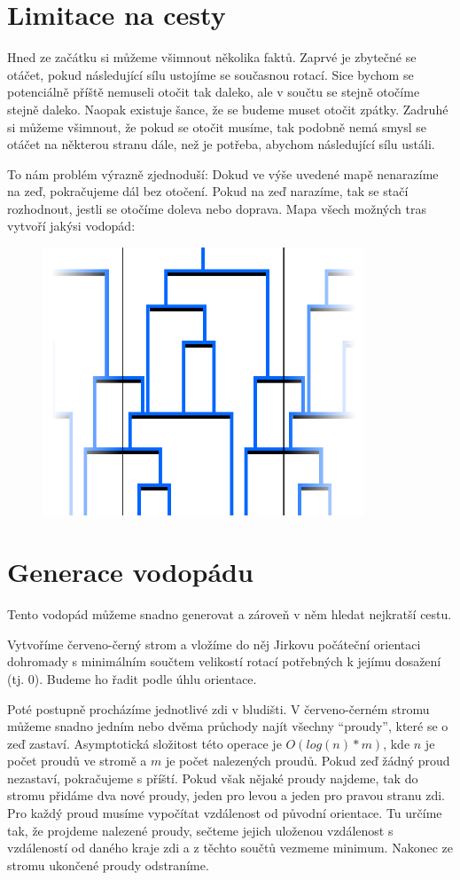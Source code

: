 \documentclass{article}
\begin{document}
\section{Limitace na cesty}

Hned ze začátku si můžeme všimnout několika faktů. Zaprvé je zbytečné se otáčet, pokud následující sílu ustojíme se současnou rotací. Sice bychom se potenciálně příště nemuseli otočit tak daleko, ale v součtu se stejně otočíme stejně daleko. Naopak existuje šance, že se budeme muset otočit zpátky. Zadruhé si můžeme všimnout, že pokud se otočit musíme, tak podobně nemá smysl se otáčet na některou stranu dále, než je potřeba, abychom následující sílu ustáli.

To nám problém výrazně zjednoduší: Dokud ve výše uvedené mapě nenarazíme na zeď, pokračujeme dál bez otočení. Pokud na zeď narazíme, tak se stačí rozhodnout, jestli se otočíme doleva nebo doprava. Mapa všech možných tras vytvoří jakýsi vodopád:

\begin{figure}[H]
    \centering
    \includegraphics[height=8cm]{waterfall/full.pdf}
\end{figure}

\section{Generace vodopádu}

Tento vodopád můžeme snadno generovat a zároveň v něm hledat nejkratší cestu.

Vytvoříme červeno-černý strom a vložíme do něj Jirkovu počáteční orientaci dohromady s minimálním součtem velikostí rotací potřebných k jejímu dosažení (tj. 0). Budeme ho řadit podle úhlu orientace.

Poté postupně procházíme jednotlivé zdi v bludišti. V červeno-černém stromu můžeme snadno jedním nebo dvěma průchody najít všechny \enquote{proudy}, které se o zeď zastaví. Asymptotická složitost této operace je \(O(log(n)*m)\), kde \(n\) je počet proudů ve stromě a \(m\) je počet nalezených proudů. Pokud zeď žádný proud nezastaví, pokračujeme s příští. Pokud však nějaké proudy najdeme, tak do stromu přidáme dva nové proudy, jeden pro levou a jeden pro pravou stranu zdi. Pro každý proud musíme vypočítat vzdálenost od původní orientace. Tu určíme tak, že projdeme nalezené proudy, sečteme jejich uloženou vzdálenost s vzdáleností od daného kraje zdi a z těchto součtů vezmeme minimum. Nakonec ze stromu ukončené proudy odstraníme.
\end{document}
